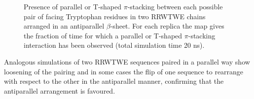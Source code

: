 \begin{figure}[p!]
\centering
{} \hspace{0.2cm}
\caption[$\pi$-stacking interaction in a RRWTWE $\beta$-sheet]{Presence of parallel or T-shaped $\pi$-stacking between each possible pair of facing Tryptophan residues in two RRWTWE chains arranged in an antiparallel $\beta$-sheet. For each replica the map gives the fraction of time for which a parallel or T-shaped $\pi$-stacking interaction has been observed (total simulation time 20 ns).}
\label{fig:hb_beta_SIhere}
\end{figure}

Analogous simulations of two RRWTWE sequences paired in a parallel way show loosening of the pairing and in some cases the flip of one sequence to rearrange with respect to the other in the antiparallel manner, confirming that the antiparallel arrangement is favoured.

